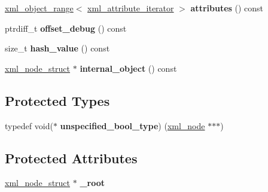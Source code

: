 \begin{DoxyCompactItemize}
\item 
\hypertarget{classpugi_1_1xml__node_a35f616e0f529ec690b06ff0760d3f969}{}\hyperlink{classpugi_1_1xml__object__range}{xml\+\_\+object\+\_\+range}$<$ \hyperlink{classpugi_1_1xml__attribute__iterator}{xml\+\_\+attribute\+\_\+iterator} $>$ {\bfseries attributes} () const \label{classpugi_1_1xml__node_a35f616e0f529ec690b06ff0760d3f969}

\item 
\hypertarget{classpugi_1_1xml__node_a77b819bd87978bebefe75d421a793cf3}{}ptrdiff\+\_\+t {\bfseries offset\+\_\+debug} () const \label{classpugi_1_1xml__node_a77b819bd87978bebefe75d421a793cf3}

\item 
\hypertarget{classpugi_1_1xml__node_a5abfc3ec37d1dd9cd0aee6a46d6cf88d}{}size\+\_\+t {\bfseries hash\+\_\+value} () const \label{classpugi_1_1xml__node_a5abfc3ec37d1dd9cd0aee6a46d6cf88d}

\item 
\hypertarget{classpugi_1_1xml__node_a73e846c7ca8f6961a88150010c362ec6}{}\hyperlink{structpugi_1_1xml__node__struct}{xml\+\_\+node\+\_\+struct} $\ast$ {\bfseries internal\+\_\+object} () const \label{classpugi_1_1xml__node_a73e846c7ca8f6961a88150010c362ec6}

\end{DoxyCompactItemize}
\subsection*{Protected Types}
\begin{DoxyCompactItemize}
\item 
\hypertarget{classpugi_1_1xml__node_a83fe32b933530b244865ee401b08b037}{}typedef void($\ast$ {\bfseries unspecified\+\_\+bool\+\_\+type}) (\hyperlink{classpugi_1_1xml__node}{xml\+\_\+node} $\ast$$\ast$$\ast$)\label{classpugi_1_1xml__node_a83fe32b933530b244865ee401b08b037}

\end{DoxyCompactItemize}
\subsection*{Protected Attributes}
\begin{DoxyCompactItemize}
\item 
\hypertarget{classpugi_1_1xml__node_a45a5b342de1e37a60565f7693f03cc08}{}\hyperlink{structpugi_1_1xml__node__struct}{xml\+\_\+node\+\_\+struct} $\ast$ {\bfseries \+\_\+root}\label{classpugi_1_1xml__node_a45a5b342de1e37a60565f7693f03cc08}

\end{DoxyCompactItemize}
